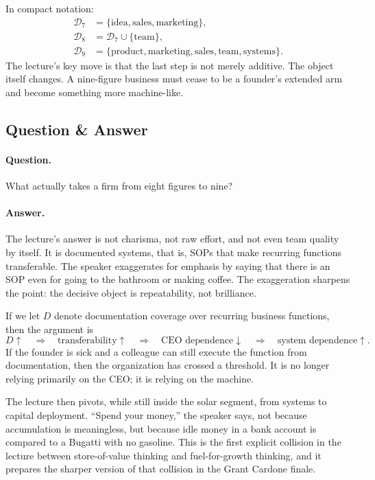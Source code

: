 In compact notation:
\begin{align}
\mathcal{D}_7 &= \{\text{idea},\text{sales},\text{marketing}\},\\
\mathcal{D}_8 &= \mathcal{D}_7\cup\{\text{team}\},\\
\mathcal{D}_9 &= \{\text{product},\text{marketing},\text{sales},\text{team},\text{systems}\}.
\end{align}
The lecture's key move is that the last step is not merely additive. The object itself changes. A nine-figure business must cease to be a founder's extended arm and become something more machine-like.

\subsection{Question \& Answer}

\paragraph{Question.}
What actually takes a firm from eight figures to nine?

\paragraph{Answer.}
The lecture's answer is not charisma, not raw effort, and not even team quality by itself. It is documented systems, that is, SOPs that make recurring functions transferable. The speaker exaggerates for emphasis by saying that there is an SOP even for going to the bathroom or making coffee. The exaggeration sharpens the point: the decisive object is repeatability, not brilliance.

If we let \(D\) denote documentation coverage over recurring business functions, then the argument is
\begin{equation}
D \uparrow
\quad \Longrightarrow \quad
\text{transferability} \uparrow
\quad \Longrightarrow \quad
\text{CEO dependence} \downarrow
\quad \Longrightarrow \quad
\text{system dependence} \uparrow.
\end{equation}
If the founder is sick and a colleague can still execute the function from documentation, then the organization has crossed a threshold. It is no longer relying primarily on the CEO; it is relying on the machine.

The lecture then pivots, while still inside the solar segment, from systems to capital deployment. ``Spend your money,'' the speaker says, not because accumulation is meaningless, but because idle money in a bank account is compared to a Bugatti with no gasoline. This is the first explicit collision in the lecture between store-of-value thinking and fuel-for-growth thinking, and it prepares the sharper version of that collision in the Grant Cardone finale.

